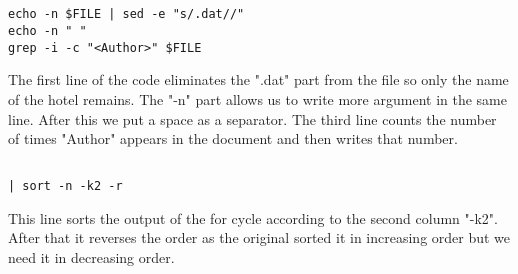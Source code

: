 \documentclass{article}
\begin{document}
\subsection{}
\begin{lstlisting}
echo -n $FILE | sed -e "s/.dat//"
echo -n " "
grep -i -c "<Author>" $FILE
\end{lstlisting}
The first line of the code eliminates the ".dat" part from the file so only the name of the hotel remains. The "-n" part allows us to write more argument in the same line. After this we put a space as a separator. The third line counts the number of times "Author" appears in the document and then writes that number.


\subsection{}
\begin{lstlisting}
| sort -n -k2 -r
\end{lstlisting}
This line sorts the output of the for cycle according to the second column "-k2". After that it reverses the order as the original sorted it in increasing order but we need it in decreasing order.
\end{document}

